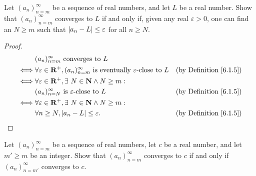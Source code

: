 \begin{exercise}\label{ex 6.1.2}
    Let \((a_n)_{n = m}^\infty\) be a sequence of real numbers, and let \(L\) be a real number.
    Show that \((a_n)_{n = m}^\infty\) converges to \(L\) if and only if, given any real \(\varepsilon > 0\), one can find an \(N \geq m\) such that \(\left\lvert a_n - L\right\rvert \leq \varepsilon\) for all \(n \geq N\).
\end{exercise}

\begin{proof}
    \begin{align*}
             & (a_n)_{n = m}^\infty \text{ converges to } L                                                                                                  \\
        \iff & \forall \varepsilon \in \mathbf{R}^+, (a_n)_{n = m}^\infty \text{ is eventually } \varepsilon\text{-close to } L & \text{(by Definition \ref{6.1.5})} \\
        \iff & \forall \varepsilon \in \mathbf{R}^+, \exists\ N \in \mathbf{N} \land N \geq m :                                                                              \\
             & (a_n)_{n = N}^\infty \text{ is } \varepsilon\text{-close to } L                                          & \text{(by Definition \ref{6.1.5})} \\
        \iff & \forall \varepsilon \in \mathbf{R}^+, \exists\ N \in \mathbf{N} \land N \geq m :                                                                              \\
             & \forall n \geq N, \left\lvert a_n - L\right\rvert \leq \varepsilon.                                                        & \text{(by Definition \ref{6.1.5})}
    \end{align*}
\end{proof}

\begin{exercise}\label{ex 6.1.3}
    Let \((a_n)_{n = m}^\infty\) be a sequence of real numbers, let \(c\) be a real number, and let \(m' \geq m\) be an integer.
    Show that \((a_n)_{n = m}^\infty\) converges to \(c\) if and only if \((a_n)_{n = m'}^\infty\) converges to \(c\).
\end{exercise}

